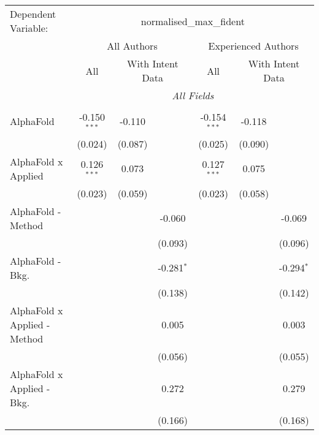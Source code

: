 \begingroup
\centering
\begin{tabular}{lcccccc}
   \tabularnewline \midrule \midrule
   Dependent Variable: & \multicolumn{6}{c}{normalised\_max\_fident}\\
 & \multicolumn{3}{c}{All Authors} & \multicolumn{3}{c}{Experienced Authors} \\
\cmidrule(lr){2-4} \cmidrule(lr){5-7}
 & \multicolumn{1}{c}{All} & \multicolumn{2}{c}{With Intent Data} & \multicolumn{1}{c}{All} & \multicolumn{2}{c}{With Intent Data} \\
\cmidrule(lr){2-2} \cmidrule(lr){3-4} \cmidrule(lr){5-5} \cmidrule(lr){6-7}
 & \multicolumn{6}{c}{\textit{All Fields}} \\ \\
   AlphaFold                      & -0.150$^{***}$ & -0.110  &               & -0.154$^{***}$ & -0.118  &   \\   
                                  & (0.024)        & (0.087) &               & (0.025)        & (0.090) &   \\   
   AlphaFold x Applied            & 0.126$^{***}$  & 0.073   &               & 0.127$^{***}$  & 0.075   &   \\   
                                  & (0.023)        & (0.059) &               & (0.023)        & (0.058) &   \\   
   AlphaFold - Method             &                &         & -0.060        &                &         & -0.069\\   
                                  &                &         & (0.093)       &                &         & (0.096)\\   
   AlphaFold - Bkg.               &                &         & -0.281$^{*}$  &                &         & -0.294$^{*}$\\   
                                  &                &         & (0.138)       &                &         & (0.142)\\   
   AlphaFold x Applied - Method   &                &         & 0.005         &                &         & 0.003\\   
                                  &                &         & (0.056)       &                &         & (0.055)\\   
   AlphaFold x Applied - Bkg.     &                &         & 0.272         &                &         & 0.279\\   
                                  &                &         & (0.166)       &                &         & (0.168)\\   

\end{tabular}

